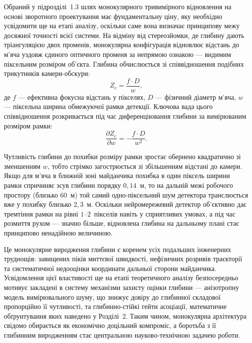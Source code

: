 Обраний у підрозділі~1.3 шлях монокулярного тривимірного відновлення на основі
зворотного проектування має фундаментальну ціну, яку необхідно усвідомити ще на етапі
аналізу, оскільки саме вона визначає принципову межу досяжної точності всієї системи.
На відміну від стереозйомки, де глибину дають тріангуляцією двох променів, монокулярна
конфігурація відновлює відстань до м'яча уздовж єдиного оптичного променя за непрямою
ознакою --- видимим піксельним розміром об'єкта. Глибина обчислюється зі співвідношення
подібних трикутників камери-обскури:
\begin{equation}Z_c = \frac{f \cdot D}{w},\end{equation}
де $f$ --- ефективна фокусна відстань у пікселях, $D$ --- фізичний діаметр м'яча,
$w$ --- піксельна ширина обмежуючої рамки детекції. Ключова вада цього співвідношення
розкривається під час диференціювання глибини за вимірюваним розміром рамки:
\begin{equation}\frac{\partial Z_c}{\partial w} = -\frac{f \cdot D}{w^2}.\end{equation}

Чутливість глибини до похибки розміру рамки зростає обернено квадратично зі зменшенням
$w$, тобто стрімко загострюється зі збільшенням відстані до камери. Якщо для м'яча в
ближній зоні майданчика похибка в один піксель ширини рамки спричиняє зсув глибини
порядку $0{,}14$~м, то на дальній межі робочого простору (близько $60$~м) той самий
одно-піксельний шум детектора транслюється вже у похибку близько $2{,}3$~м. Оскільки
нейромережевий детектор об'єктивно дає тремтіння рамки на рівні $1$--$2$~пікселів навіть
у сприятливих умовах, а під час розмиття рухом --- значно більше, відновлена глибина на
дальньому плані стає принципово ненадійною величиною.

Це монокулярне виродження глибини є коренем усіх подальших інженерних труднощів:
завищених піків миттєвої швидкості, нефізичних розривів траєкторії та систематичної
недооцінки координати дальньої сторони майданчика. Усвідомлення цієї властивості ще на
етапі теоретичного аналізу безпосередньо мотивує закладені в систему механізми захисту
оцінки глибини --- анізотропну модель вимірювального шуму, що знижує довіру до глибинної
складової пропорційно її чутливості, та глибинно-стійкі гейти асоціації, математичне
обґрунтування яких наведено у Розділі~2. Таким чином, монокулярна архітектура свідомо
обирається як економічно доцільний компроміс, а боротьба з її глибинним виродженням
стає центральною науково-технічною задачею роботи.

